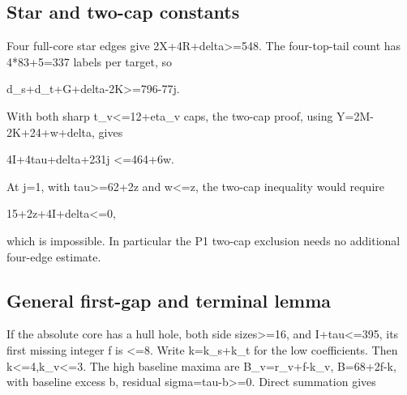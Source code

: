 \documentclass[10pt,a4paper]{article}
\theoremstyle{definition}
\begin{document}
\hypertarget{star-and-two-cap-constants}{%
\subsection{Star and two-cap
constants}\label{star-and-two-cap-constants}}

Four full-core star edges give 2X+\allowbreak{}4R+\allowbreak{}delta\textgreater=\allowbreak{}548. The
four-top-tail count has 4*83+\allowbreak{}5=\allowbreak{}337 labels per target,\allowbreak{} so

d\_\allowbreak{}s+\allowbreak{}d\_\allowbreak{}t+\allowbreak{}G+\allowbreak{}delta-2K\textgreater=\allowbreak{}796-77j.

With both sharp t\_\allowbreak{}v\textless=\allowbreak{}12+\allowbreak{}eta\_\allowbreak{}v caps,\allowbreak{} the two-cap proof,\allowbreak{} using
Y=\allowbreak{}2M-2K+\allowbreak{}24+\allowbreak{}w+\allowbreak{}delta,\allowbreak{} gives

4I+\allowbreak{}4tau+\allowbreak{}delta+\allowbreak{}231j \textless=\allowbreak{}464+\allowbreak{}6w.

At j=\allowbreak{}1,\allowbreak{} with tau\textgreater=\allowbreak{}62+\allowbreak{}2z and w\textless=\allowbreak{}z,\allowbreak{} the two-cap
inequality would require

15+\allowbreak{}2z+\allowbreak{}4I+\allowbreak{}delta\textless=\allowbreak{}0,\allowbreak{}

which is impossible. In particular the P1 two-cap exclusion needs no
additional four-edge estimate.

\hypertarget{general-first-gap-and-terminal-lemma}{%
\subsection{General first-gap and terminal
lemma}\label{general-first-gap-and-terminal-lemma}}

If the absolute core has a hull hole,\allowbreak{} both side sizes\textgreater=\allowbreak{}16,\allowbreak{}
and I+\allowbreak{}tau\textless=\allowbreak{}395,\allowbreak{} its first missing integer f is \textless=\allowbreak{}8.
Write k=\allowbreak{}k\_\allowbreak{}s+\allowbreak{}k\_\allowbreak{}t for the low coefficients. Then
k\textless=\allowbreak{}4,\allowbreak{}k\_\allowbreak{}v\textless=\allowbreak{}3. The high baseline maxima are
B\_\allowbreak{}v=\allowbreak{}r\_\allowbreak{}v+\allowbreak{}f-k\_\allowbreak{}v,\allowbreak{} B=\allowbreak{}68+\allowbreak{}2f-k,\allowbreak{} with baseline excess b,\allowbreak{} residual
sigma=\allowbreak{}tau-b\textgreater=\allowbreak{}0. Direct summation gives
\end{document}
